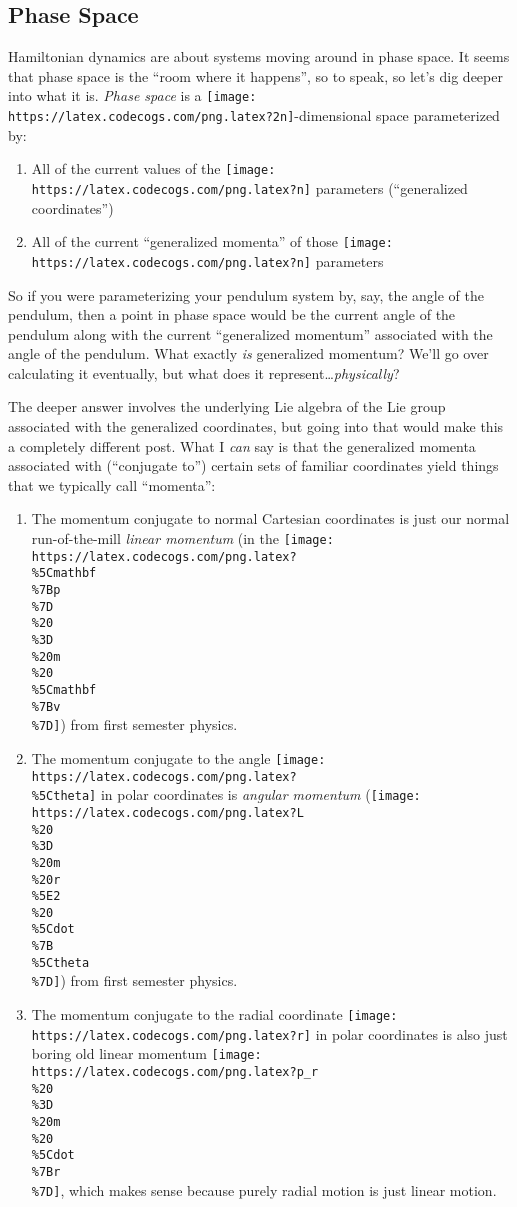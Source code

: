 \documentclass[]{article}
\begin{document}
\subsection{Phase Space}\label{phase-space}

Hamiltonian dynamics are about systems moving around in phase space. It seems
that phase space is the ``room where it happens'', so to speak, so let's dig
deeper into what it is. \emph{Phase space} is a
\texttt{[image: https://latex.codecogs.com/png.latex?2n]}-dimensional space
parameterized by:

\begin{enumerate}
\def\labelenumi{\arabic{enumi}.}
\tightlist
\item
  All of the current values of the
  \texttt{[image: https://latex.codecogs.com/png.latex?n]} parameters
  (``generalized coordinates'')
\item
  All of the current ``generalized momenta'' of those
  \texttt{[image: https://latex.codecogs.com/png.latex?n]} parameters
\end{enumerate}

So if you were parameterizing your pendulum system by, say, the angle of the
pendulum, then a point in phase space would be the current angle of the pendulum
along with the current ``generalized momentum'' associated with the angle of the
pendulum. What exactly \emph{is} generalized momentum? We'll go over calculating
it eventually, but what does it represent\ldots{}\emph{physically}?

The deeper answer involves the underlying Lie algebra of the Lie group
associated with the generalized coordinates, but going into that would make this
a completely different post. What I \emph{can} say is that the generalized
momenta associated with (``conjugate to'') certain sets of familiar coordinates
yield things that we typically call ``momenta'':

\begin{enumerate}
\def\labelenumi{\arabic{enumi}.}
\item
  The momentum conjugate to normal Cartesian coordinates is just our normal
  run-of-the-mill \emph{linear momentum} (in the
  \texttt{[image: https://latex.codecogs.com/png.latex?\\\%5Cmathbf\\\%7Bp\\\%7D\\\%20\\\%3D\\\%20m\\\%20\\\%5Cmathbf\\\%7Bv\\\%7D]})
  from first semester physics.
\item
  The momentum conjugate to the angle
  \texttt{[image: https://latex.codecogs.com/png.latex?\\\%5Ctheta]} in polar
  coordinates is \emph{angular momentum}
  (\texttt{[image: https://latex.codecogs.com/png.latex?L\\\%20\\\%3D\\\%20m\\\%20r\\\%5E2\\\%20\\\%5Cdot\\\%7B\\\%5Ctheta\\\%7D]})
  from first semester physics.
\item
  The momentum conjugate to the radial coordinate
  \texttt{[image: https://latex.codecogs.com/png.latex?r]} in polar coordinates
  is also just boring old linear momentum
  \texttt{[image: https://latex.codecogs.com/png.latex?p\_r\\\%20\\\%3D\\\%20m\\\%20\\\%5Cdot\\\%7Br\\\%7D]},
  which makes sense because purely radial motion is just linear motion.
\end{enumerate}
\end{document}
